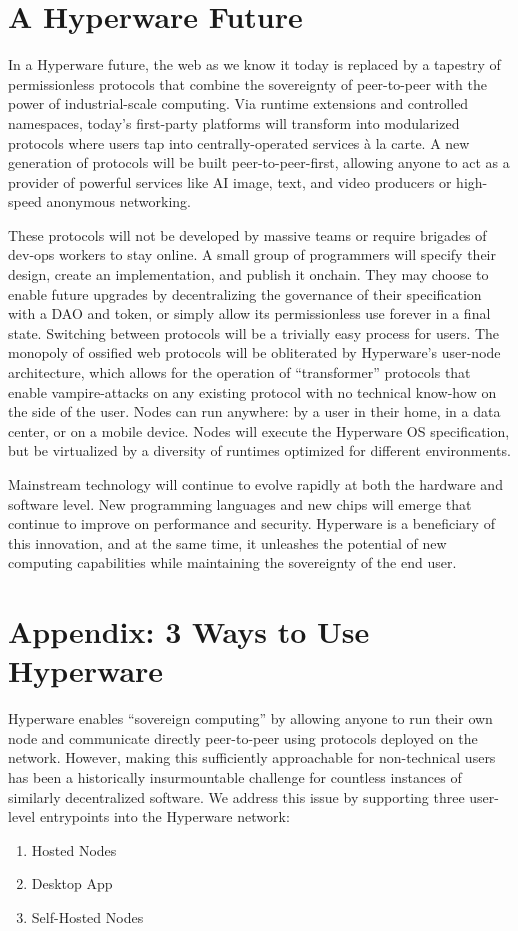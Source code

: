 \documentclass[runningheads]{llncs}
\begin{document}
\clearpage

\section{A Hyperware Future}
\label{sec:future}

In a Hyperware future, the web as we know it today is replaced by a tapestry of permissionless protocols that combine the sovereignty of peer-to-peer with the power of industrial-scale computing.
Via runtime extensions and controlled namespaces, today's first-party platforms will transform into modularized protocols where users tap into centrally-operated services à la carte.
A new generation of protocols will be built peer-to-peer-first, allowing anyone to act as a provider of powerful services like AI image, text, and video producers or high-speed anonymous networking.

These protocols will not be developed by massive teams or require brigades of dev-ops workers to stay online.
A small group of programmers will specify their design, create an implementation, and publish it onchain.
They may choose to enable future upgrades by decentralizing the governance of their specification with a DAO and token, or simply allow its permissionless use forever in a final state.
Switching between protocols will be a trivially easy process for users.
The monopoly of ossified web protocols will be obliterated by Hyperware's user-node architecture, which allows for the operation of ``transformer'' protocols that enable vampire-attacks on any existing protocol with no technical know-how on the side of the user.
Nodes can run anywhere: by a user in their home, in a data center, or on a mobile device.
Nodes will execute the Hyperware OS specification, but be virtualized by a diversity of runtimes optimized for different environments.

Mainstream technology will continue to evolve rapidly at both the hardware and software level. New programming languages and new chips will emerge that continue to improve on performance and security.
Hyperware is a beneficiary of this innovation, and at the same time, it unleashes the potential of new computing capabilities while maintaining the sovereignty of the end user.


\newpage
\section{Appendix: 3 Ways to Use Hyperware}

Hyperware enables ``sovereign computing'' by allowing anyone to run their own node and communicate directly peer-to-peer using protocols deployed on the network.
However, making this sufficiently approachable for non-technical users has been a historically insurmountable challenge for countless instances of similarly decentralized software.
We address this issue by supporting three user-level entrypoints into the Hyperware network:
\begin{enumerate}
    \item Hosted Nodes
    \item Desktop App
    \item Self-Hosted Nodes
\end{enumerate}
\end{document}
